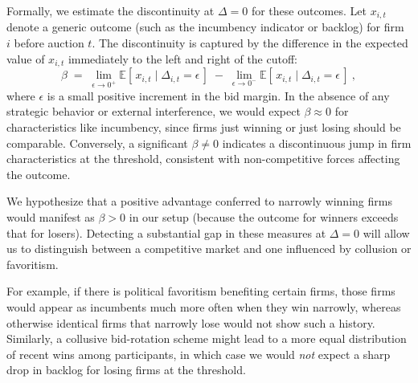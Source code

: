 Formally, we estimate the discontinuity at $\Delta=0$ for these outcomes. Let $x_{i,t}$ denote a generic outcome (such as the incumbency indicator or backlog) for firm $i$ before auction $t$. The discontinuity is captured by the difference in the expected value of $x_{i,t}$ immediately to the left and right of the cutoff:
\[
\beta \;=\; \lim_{\epsilon \to 0^+} \mathbb{E}[\,x_{i,t}\mid \Delta_{i,t}=\epsilon\,] \;-\; 
\lim_{\epsilon \to 0^-} \mathbb{E}[\,x_{i,t}\mid \Delta_{i,t}=\epsilon\,]~,
\]
where $\epsilon$ is a small positive increment in the bid margin. In the absence of any strategic behavior or external interference, we would expect $\beta \approx 0$ for characteristics like incumbency, since firms just winning or just losing should be comparable. Conversely, a significant $\beta \neq 0$ indicates a discontinuous jump in firm characteristics at the threshold, consistent with non-competitive forces affecting the outcome.

We hypothesize that a positive advantage conferred to narrowly winning firms would manifest as $\beta > 0$ in our setup (because the outcome for winners exceeds that for losers). Detecting a substantial gap in these measures at $\Delta=0$ will allow us to distinguish between a competitive market and one influenced by collusion or favoritism. 


For example, if there is political favoritism benefiting certain firms, those firms would appear as incumbents much more often when they win narrowly, whereas otherwise identical firms that narrowly lose would not show such a history. Similarly, a collusive bid-rotation scheme might lead to a more equal distribution of recent wins among participants, in which case we would \emph{not} expect a sharp drop in backlog for losing firms at the threshold. 
